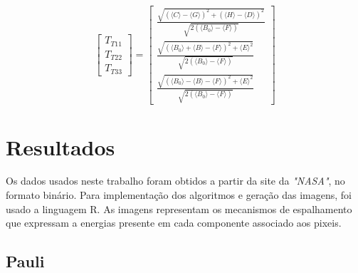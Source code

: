 \documentclass{article}
\begin{document}
\begin{equation}
    \begin{bmatrix}
        T_{T11} \\
	    T_{T22}\\
	    T_{T33}
    \end{bmatrix} = 
    \begin{bmatrix}
        \frac{\sqrt{(\langle C \rangle - \langle G \rangle)^2 + (\langle H \rangle - \langle D \rangle)^2}}{\sqrt{2 (\langle B_{0} \rangle - \langle F \rangle)}} \\
        
	    \frac{\sqrt{(\langle B_{0} \rangle + \langle B \rangle - \langle F \rangle)^2 + \langle E \rangle^2}}{\sqrt{2 (\langle B_{0} \rangle - \langle F \rangle)}} \\
	    
	    \frac{\sqrt{(\langle B_{0} \rangle - \langle B \rangle - \langle F \rangle)^2 + \langle E \rangle^2}}{\sqrt{2 (\langle B_{0} \rangle - \langle F \rangle)}}
    \end{bmatrix}
\end{equation}

\section{\textbf{Resultados}}
Os dados usados neste trabalho foram obtidos a partir da site da \textit{"NASA"}, no formato binário. Para implementação dos algoritmos e geração das imagens, foi usado a linguagem R. As imagens representam os mecanismos de espalhamento que expressam a energias presente em cada componente associado aos pixeis.

\subsection{\textbf{Pauli}}
\end{document}
